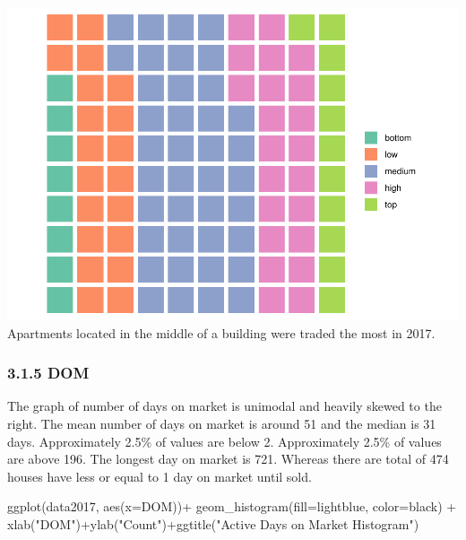 \documentclass[
]{article}
\newenvironment{Shaded}{\begin{snugshade}}{\end{snugshade}}
\newcommand{\AttributeTok}[1]{\textcolor[rgb]{0.77,0.63,0.00}{#1}}
\newcommand{\FunctionTok}[1]{\textcolor[rgb]{0.00,0.00,0.00}{#1}}
\newcommand{\NormalTok}[1]{#1}
\newcommand{\SpecialCharTok}[1]{\textcolor[rgb]{0.00,0.00,0.00}{#1}}
\newcommand{\StringTok}[1]{\textcolor[rgb]{0.31,0.60,0.02}{#1}}
\begin{document}
\includegraphics{Project_files/figure-latex/unnamed-chunk-12-1.pdf}
Apartments located in the middle of a building were traded the most in
2017.

\hypertarget{dom}{%
\subsubsection{3.1.5 DOM}\label{dom}}

The graph of number of days on market is unimodal and heavily skewed to
the right. The mean number of days on market is around 51 and the median
is 31 days. Approximately 2.5\% of values are below 2. Approximately
2.5\% of values are above 196. The longest day on market is 721. Whereas
there are total of 474 houses have less or equal to 1 day on market
until sold.

\begin{Shaded}
\begin{Highlighting}[]
\FunctionTok{ggplot}\NormalTok{(data2017, }\FunctionTok{aes}\NormalTok{(}\AttributeTok{x=}\NormalTok{DOM))}\SpecialCharTok{+}
  \FunctionTok{geom\_histogram}\NormalTok{(}\AttributeTok{fill=}\StringTok{\textquotesingle{}lightblue\textquotesingle{}}\NormalTok{, }\AttributeTok{color=}\StringTok{\textquotesingle{}black\textquotesingle{}}\NormalTok{) }\SpecialCharTok{+}
  \FunctionTok{xlab}\NormalTok{(}\StringTok{"DOM"}\NormalTok{)}\SpecialCharTok{+}\FunctionTok{ylab}\NormalTok{(}\StringTok{"Count"}\NormalTok{)}\SpecialCharTok{+}\FunctionTok{ggtitle}\NormalTok{(}\StringTok{"Active Days on Market Histogram"}\NormalTok{)}
\end{Highlighting}
\end{Shaded}
\end{document}
